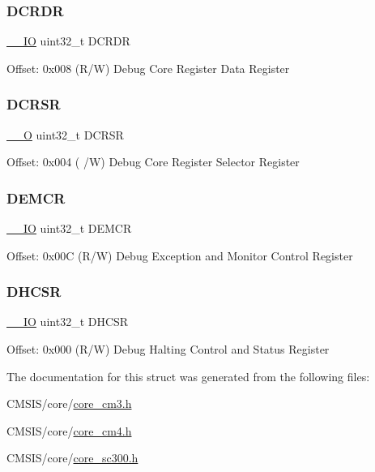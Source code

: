 \subsubsection{\texorpdfstring{DCRDR}{DCRDR}}
{\footnotesize\ttfamily \mbox{\hyperlink{core__sc300_8h_aec43007d9998a0a0e01faede4133d6be}{\+\_\+\+\_\+\+IO}} uint32\+\_\+t D\+C\+R\+DR}

Offset\+: 0x008 (R/W) Debug Core Register Data Register \mbox{\label{struct_core_debug___type_a7b49cb58573da77cc8a83a1b21262180}} 
\subsubsection{\texorpdfstring{DCRSR}{DCRSR}}
{\footnotesize\ttfamily \mbox{\hyperlink{core__sc300_8h_a7e25d9380f9ef903923964322e71f2f6}{\+\_\+\+\_\+O}} uint32\+\_\+t D\+C\+R\+SR}

Offset\+: 0x004 ( /W) Debug Core Register Selector Register \mbox{\label{struct_core_debug___type_a6cdfc0a6ce3e988cc02c2d6e8107d193}} 
\subsubsection{\texorpdfstring{DEMCR}{DEMCR}}
{\footnotesize\ttfamily \mbox{\hyperlink{core__sc300_8h_aec43007d9998a0a0e01faede4133d6be}{\+\_\+\+\_\+\+IO}} uint32\+\_\+t D\+E\+M\+CR}

Offset\+: 0x00C (R/W) Debug Exception and Monitor Control Register \mbox{\label{struct_core_debug___type_a39bc5e68dc6071187fbe2348891eabfa}} 
\subsubsection{\texorpdfstring{DHCSR}{DHCSR}}
{\footnotesize\ttfamily \mbox{\hyperlink{core__sc300_8h_aec43007d9998a0a0e01faede4133d6be}{\+\_\+\+\_\+\+IO}} uint32\+\_\+t D\+H\+C\+SR}

Offset\+: 0x000 (R/W) Debug Halting Control and Status Register 

The documentation for this struct was generated from the following files\+:\begin{DoxyCompactItemize}
\item 
C\+M\+S\+I\+S/core/\mbox{\hyperlink{core__cm3_8h}{core\+\_\+cm3.\+h}}\item 
C\+M\+S\+I\+S/core/\mbox{\hyperlink{core__cm4_8h}{core\+\_\+cm4.\+h}}\item 
C\+M\+S\+I\+S/core/\mbox{\hyperlink{core__sc300_8h}{core\+\_\+sc300.\+h}}\end{DoxyCompactItemize}
